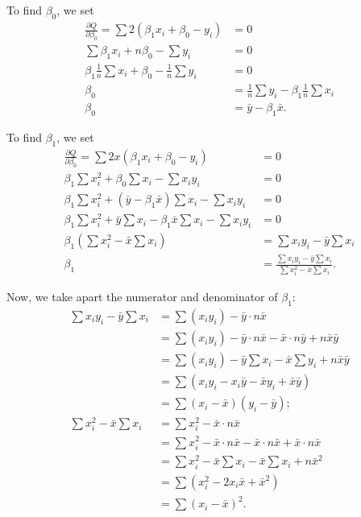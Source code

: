 \documentclass{article}
\begin{document}
To find $\beta_0$, we set
\begin{align*}
    \frac{\partial Q}{\partial \beta_0} = \sum 2(\beta_1x_i+\beta_0-y_i) & = 0 \\
    \sum\beta_1x_i + n\beta_0-\sum y_i & = 0 \\
    \beta_1\frac{1}{n}\sum x_i + \beta_0 - \frac{1}{n}\sum y_i & = 0 \\
    \beta_0 & = \frac{1}{n}\sum y_i - \beta_1\frac{1}{n}\sum x_i \\
    \beta_0 & = \bar{y} - \beta_1\bar{x}.
\end{align*}

To find $\beta_1$, we set
\begin{align*}
    \frac{\partial Q}{\partial \beta_0} = \sum 2x(\beta_1x_i+\beta_0-y_i) & = 0 \\
    \beta_1\sum x_i^2+\beta_0\sum x_i - \sum x_iy_i & = 0 \\
    \beta_1\sum x_i^2 + \left(\bar{y} - \beta_1\bar{x}\right)\sum x_i - \sum x_iy_i & = 0 \\
    \beta_1\sum x_i^2 + \bar{y}\sum x_i - \beta_1\bar{x}\sum x_i - \sum x_iy_i & = 0 \\
    \beta_1\left(\sum x_i^2 - \bar{x}\sum x_i\right) & = \sum x_iy_i - \bar{y}\sum x_i \\
    \beta_1 & = \frac{\sum x_iy_i - \bar{y}\sum x_i}{\sum x_i^2 - \bar{x}\sum x_i}.
\end{align*}

Now, we take apart the numerator and denominator of $\beta_1$:
\begin{align*}
    \sum x_iy_i - \bar{y}\sum x_i & = \sum (x_iy_i) - \bar{y}\cdot n\bar{x} \\
    & = \sum (x_iy_i) - \bar{y}\cdot n\bar{x}  - \bar{x}\cdot n\bar{y} + n\bar{x}\bar{y} \\
    & = \sum (x_iy_i) - \bar{y}\sum x_i - \bar{x}\sum y_i + n\bar{x}\bar{y} \\
    & = \sum\left(x_iy_i - x_i\bar{y} - \bar{x}y_i + \bar{x}\bar{y}\right) \\
    & = \sum(x_i-\bar{x})(y_i-\bar{y}); \\
    \sum x_i^2 - \bar{x}\sum x_i & = \sum x_i^2 - \bar{x}\cdot n\bar{x} \\
    & = \sum x_i^2 - \bar{x}\cdot n\bar{x} - \bar{x}\cdot n\bar{x} + \bar{x}\cdot n\bar{x} \\
    & = \sum x_i^2 - \bar{x}\sum x_i - \bar{x}\sum x_i + n\bar{x}^2 \\
    & = \sum\left(x_i^2 - 2x_i\bar{x} + \bar{x}^2\right) \\
    & = \sum(x_i-\bar{x})^2.
\end{align*}
\end{document}
